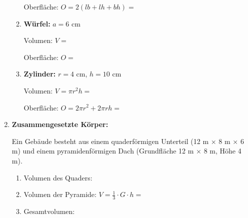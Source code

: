 \begin{enumerate}[label=\arabic*.,resume]
\begin{enumerate}[label=\alph*)]
        Oberfläche: $O = 2(lb + lh + bh) = $ \underline{\hspace{6cm}}

        \vspace{1.5cm}

        \item \textbf{Würfel:} $a = 6$ cm

        Volumen: $V = $ \underline{\hspace{6cm}}

        Oberfläche: $O = $ \underline{\hspace{6cm}}

        \vspace{1.5cm}

        \item \textbf{Zylinder:} $r = 4$ cm, $h = 10$ cm

        Volumen: $V = \pi r^2 h = $ \underline{\hspace{6cm}}

        Oberfläche: $O = 2\pi r^2 + 2\pi rh = $ \underline{\hspace{6cm}}

        \vspace{1.5cm}

    \end{enumerate}

    \item \textbf{Zusammengesetzte Körper:}

    Ein Gebäude besteht aus einem quaderförmigen Unterteil (12 m × 8 m × 6 m) und einem pyramidenförmigen Dach (Grundfläche 12 m × 8 m, Höhe 4 m).

    \begin{enumerate}[label=\alph*)]
        \item Volumen des Quaders: \underline{\hspace{6cm}}

        \item Volumen der Pyramide: $V = \frac{1}{3} \cdot G \cdot h = $ \underline{\hspace{6cm}}

        \item Gesamtvolumen: \underline{\hspace{6cm}}

    \end{enumerate}

\end{enumerate}